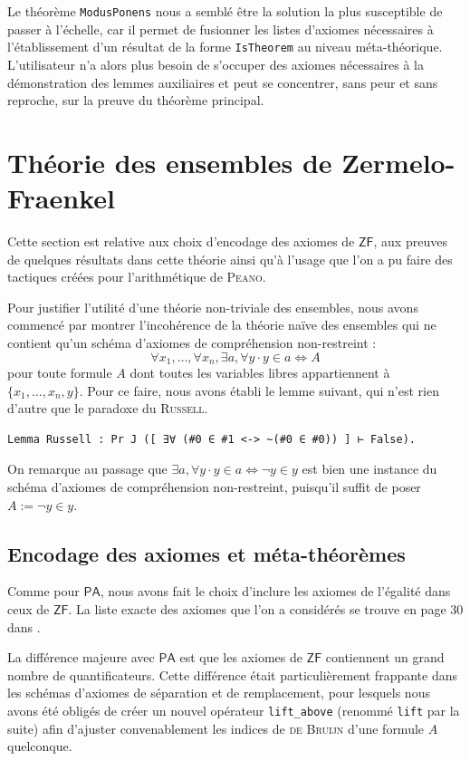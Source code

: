 \documentclass[a4paper]{article}
\newcommand{\PA}{\mathsf{PA}}
\newcommand{\ZF}{\mathsf{ZF}}
\begin{document}
Le théorème \verb+ModusPonens+ nous a semblé être la solution la plus susceptible de passer à l'échelle, car il permet de fusionner les listes d'axiomes nécessaires à l'établissement d'un résultat de la forme \verb+IsTheorem+ au niveau méta-théorique. L'utilisateur n'a alors plus besoin de s'occuper des axiomes nécessaires à la démonstration des lemmes auxiliaires et peut se concentrer, sans peur et sans reproche, sur la preuve du théorème principal.

\newpage


\section{Théorie des ensembles de {\sc Zermelo-Fraenkel}}

Cette section est relative aux choix d'encodage des axiomes de $\ZF$, aux preuves de quelques résultats dans cette théorie ainsi qu'à l'usage que l'on a pu faire des tactiques créées pour l'arithmétique de \textsc{Peano}.

Pour justifier l'utilité d'une théorie non-triviale des ensembles, nous avons commencé par montrer l'incohérence de la théorie naïve des ensembles qui ne contient qu'un schéma d'axiomes de compréhension non-restreint : \[ \forall x_1, \ldots, \forall x_n, \exists a, \forall y \cdot y \in a \Leftrightarrow A \] pour toute formule $A$ dont toutes les variables libres appartiennent à $\{ x_1, \ldots, x_n, y \}$. Pour ce faire, nous avons établi le lemme suivant, qui n'est rien d'autre que le paradoxe du \textsc{Russell}. \begin{verbatim}
Lemma Russell : Pr J ([ ∃∀ (#0 ∈ #1 <-> ~(#0 ∈ #0)) ] ⊢ False).
\end{verbatim}
On remarque au passage que $\exists a, \forall y \cdot y \in a \Leftrightarrow \neg y \in y$ est bien une instance du schéma d'axiomes de compréhension non-restreint, puisqu'il suffit de poser $A := \neg y \in y$.

\subsection{Encodage des axiomes et méta-théorèmes}

Comme pour $\PA$, nous avons fait le choix d'inclure les axiomes de l'égalité dans ceux de $\ZF$. La liste exacte des axiomes que l'on a considérés se trouve en page 30 dans \cite{poly}.

La différence majeure avec $\PA$ est que les axiomes de $\ZF$ contiennent un grand nombre de quantificateurs. Cette différence était particulièrement frappante dans les schémas d'axiomes de séparation et de remplacement, pour lesquels nous avons été obligés de créer un nouvel opérateur \verb+lift_above+ (renommé \verb+lift+ par la suite) afin d'ajuster convenablement les indices de \textsc{de Bruijn} d'une formule $A$ quelconque. 
\smallskip
\end{document}
